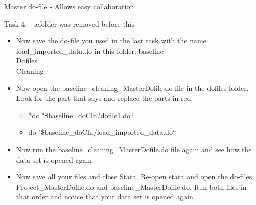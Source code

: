 \documentclass[aspectratio=169]{beamer}
\begin{document}

\begin{frame}[fragile]{Master do-file - Allows easy collaboration}
\end{frame}

\begin{frame}{Task 4. - iefolder was removed before this}
\begin{itemize}
	\item Now save the do-file you used in the last task with the name load\_imported\_data.do in this folder: baseline\\Dofiles\\Cleaning
	\item Now open the baseline\_cleaning\_MasterDofile.do file in the dofiles folder. Look for the part that says and replace the parts in red:
		\begin{itemize}
			\item 	*do "\$baseline\_doCln/dofile1.do“
			\item do "\$baseline\_doCln/load\_imported\_data.do“
		\end{itemize}
	\item Now run the baseline\_cleaning\_MasterDofile.do  file again and see how the data set is opened again
	\item Now save all your files and close Stata. Re-open stata and open the do-files Project\_MasterDofile.do and baseline\_MasterDofile.do. Run both files in that order and notice that your data set is opened again. 
\end{itemize}
\end{frame}
\end{document}
